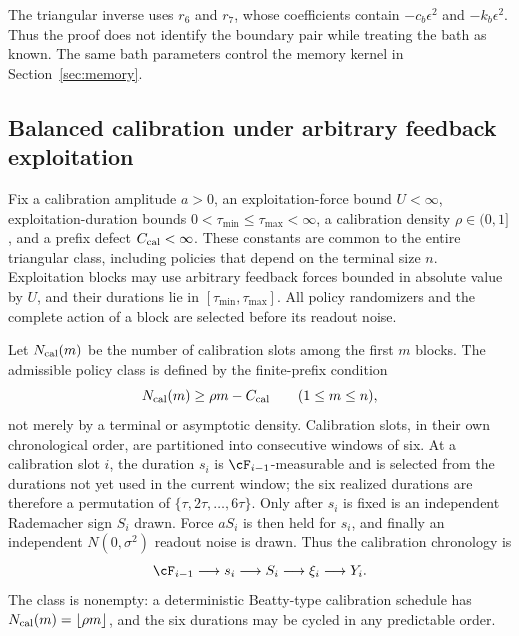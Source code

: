 \begin{remark}
The triangular inverse uses \(r_6\) and \(r_7\), whose coefficients contain
\(-c_b\epsilon^2\) and \(-k_b\epsilon^2\).  Thus the proof does not identify
the boundary pair while treating the bath as known.  The same bath parameters
control the memory kernel in Section~\ref{sec:memory}.
\end{remark}

\subsection{Balanced calibration under arbitrary feedback exploitation}
\label{sec:balanced-design}

Fix a calibration amplitude \(a>0\), an exploitation-force bound
\(U<\infty\), exploitation-duration bounds
\(0<\tau_{\min}\le\tau_{\max}<\infty\), a calibration density
\(\rho\in(0,1]\), and a prefix defect \(C_{\rm cal}<\infty\).  These
constants are common to the entire triangular class, including policies that
depend on the terminal size \(n\).  Exploitation blocks may use arbitrary
feedback forces bounded in absolute value by \(U\), and their durations lie
in \([\tau_{\min},\tau_{\max}]\).  All policy randomizers and the complete
action of a block are selected before its readout noise.

Let \(N_{\rm cal}(m)\) be the number of calibration slots among the first
\(m\) blocks.  The admissible policy class is defined by the finite-prefix
condition
\begin{equation}
 N_{\rm cal}(m)\ge \rho m-C_{\rm cal}
 \qquad(1\le m\le n),
 \label{eq:prefix-calibration}
\end{equation}
not merely by a terminal or asymptotic density.  Calibration slots, in their
own chronological order, are partitioned into consecutive windows of six.
At a calibration slot \(i\), the duration \(s_i\) is
\(\cF_{i-1}\)-measurable and is selected from the durations not yet used in
the current window; the six realized durations are therefore a permutation of
\(\{\tau,2\tau,\ldots,6\tau\}\).  Only after \(s_i\) is fixed is an
independent Rademacher sign \(S_i\) drawn.  Force \(aS_i\) is then held for
\(s_i\), and finally an independent \(N(0,\sigma^2)\) readout noise is drawn.
Thus the calibration chronology is
\[
 \cF_{i-1}\longrightarrow s_i\longrightarrow S_i
 \longrightarrow\xi_i\longrightarrow Y_i.
\]
The class is nonempty: a deterministic Beatty-type calibration schedule has
\(N_{\rm cal}(m)=\lfloor\rho m\rfloor\), and the six durations may be cycled
in any predictable order.

